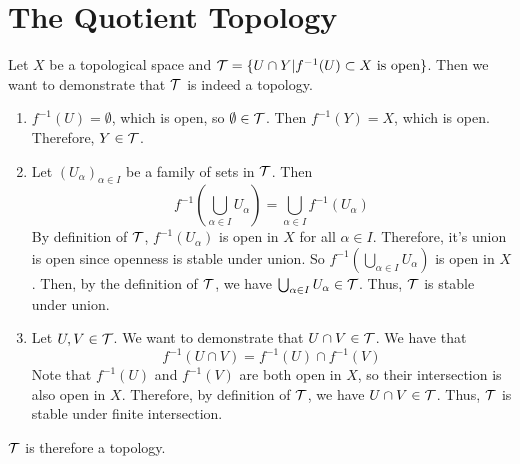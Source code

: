 \section{The Quotient Topology}


\begin{myproof}
	Let $X$ be a topological space and $\mathcal{T} = \{U\cap Y| f^{-1}(U)\subset X\text{ is open}\}$. Then we want to demonstrate that $\mathcal{T}$ is indeed a topology.
	\begin{enumerate}
		\item $f^{-1}(U) = \emptyset$, which is open, so $\emptyset\in\mathcal{T}$. Then $f^{-1}(Y) = X$, which is open. Therefore, $Y\in\mathcal{T}$.
		\item Let $(U_\alpha)_{\alpha\in I}$ be a family of sets in $\mathcal{T}$. Then 
		$$f^{-1}(\bigcup_{\alpha\in I}U_\alpha) = \bigcup_{\alpha\in I}f^{-1}(U_\alpha)$$
		By definition of $\mathcal{T}$, $f^{-1}(U_\alpha)$ is open in $X$ for all $\alpha\in I$. Therefore, it's union is open since openness is stable under union. So $f^{-1}(\bigcup_{\alpha\in I}U_\alpha)$ is open in $X$. Then, by the definition of $\mathcal{T}$, we have $\bigcup_{\alpha\in I}U_\alpha\in\mathcal{T}$. Thus, $\mathcal{T}$ is stable under union.
		\item Let $U,V\in\mathcal{T}$. We want to demonstrate that $U\cap V\in\mathcal{T}$. We have that 
		$$f^{-1}(U\cap V) = f^{-1}(U)\cap f^{-1}(V)$$
		Note that $f^{-1}(U)$ and $f^{-1}(V)$ are both open in $X$, so their intersection is also open in $X$. Therefore, by definition of $\mathcal{T}$, we have $U\cap V\in \mathcal{T}$. Thus, $\mathcal{T}$ is stable under finite intersection.
	\end{enumerate}
	$\mathcal{T}$ is therefore a topology.
\end{myproof}


